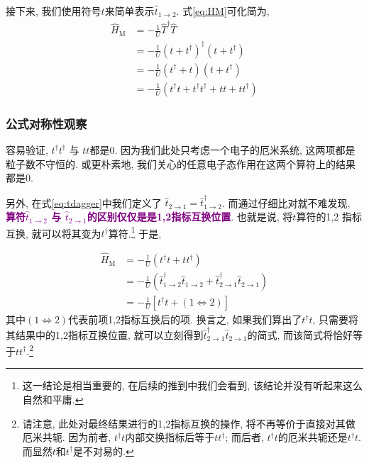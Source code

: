 \documentclass[a4paper, 12pt]{article}
\newcommand{\purple}{\textcolor{purple}}
\begin{document}
接下来, 我们使用符号\(t\)来简单表示\(\widehat{t}_{1\to{}2}\). 式\eqref{eq:HM}可化简为, 
\begin{equation}
  \begin{aligned}
    \widehat{H}_{\text{M}} &= -\frac{1}{U} \widehat{T}^\dagger\widehat{T}\\
    &= -\frac{1}{U} (t + t^{\dagger})^\dagger(t + t^{\dagger})\\
    &= -\frac{1}{U}(t^{\dagger} + t)(t + t^{\dagger})\\
    &= -\frac{1}{U}(t^{\dagger}t + t^{\dagger}t^{\dagger} + tt + tt^{\dagger})
  \end{aligned}
\end{equation}

\subsubsection{公式对称性观察}
容易验证, \(t^{\dagger}t^{\dagger}\) 与 \(tt\)都是0. 因为我们此处只考虑一个电子的厄米系统, 这两项都是粒子数不守恒的. 或更朴素地, 我们关心的任意电子态作用在这两个算符上的结果都是0.

另外, 在式\eqref{eq:tdagger}中我们定义了 \(\widehat{t}_{2\to{}1} = \widehat{t}_{1\to{}2}^\dagger\). 而通过仔细比对就不难发现, \purple{\textbf{算符\(\widehat{t}_{1\to{}2}\) 与 \(\widehat{t}_{2\to{}1}\)的区别仅仅是是1,2指标互换位置}}. 也就是说, 将\(t\)算符的1,2 指标互换, 就可以将其变为\(t^\dagger\)算符.\footnote{这一结论是相当重要的, 在后续的推到中我们会看到, 该结论并没有听起来这么自然和平庸.}
于是, 

\begin{equation}
  \begin{aligned}
  \widehat{H}_{\text{M}} 
  &= -\frac{1}{U}(t^{\dagger}t + tt^{\dagger})\\
  &=  -\frac{1}{U} (\widehat{t}_{1\to{}2}^\dagger\widehat{t}_{1\to{}2} + \widehat{t}_{2\to{}1}^\dagger\widehat{t}_{2\to{}1})\\
  &= -\frac{1}{U}\left[t^\dagger{}t + (1\Leftrightarrow{}2)\right]
  \end{aligned}
\end{equation}
其中\((1\Leftrightarrow{}2)\)代表前项1,2指标互换后的项. 换言之, 如果我们算出了\(t^\dagger{}t\), 只需要将其结果中的1,2指标互换位置, 就可以立刻得到\(\widehat{t}_{2\to{}1}^\dagger\widehat{t}_{2\to{}1}\)的简式, 而该简式将恰好等于\(tt^\dagger\).\footnote{请注意, 此处对最终结果进行的1,2指标互换的操作, 将不再等价于直接对其做厄米共轭. 因为前者, \(t^\dagger{}t\)内部交换指标后等于\(tt^\dagger\); 而后者, \(t^\dagger{}t\)的厄米共轭还是\(t^\dagger{}t\). 而显然\(t\)和\(t^\dagger\)是不对易的.} 
\end{document}
